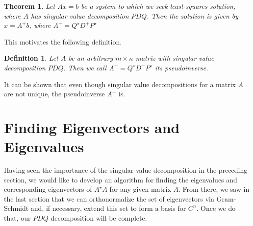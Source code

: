 \documentclass[12pt,reqno]{amsart}
\numberwithin{equation}{section}  %
\newtheorem{theorem}{Theorem}
\newtheorem*{definition}{Definition}
\begin{document}
\begin{theorem}
Let $Ax = b$ be a system to which we seek least-squares solution, where
$A$ has singular value decomposition $PDQ$.
Then the solution is given by $x = A^{+}b$, where $A^{+} = Q^{\star} D^{+} P^{\star}$
\end{theorem}
This motivates the following definition.
\begin{definition}
Let $A$ be an arbitrary $m \times n$ matrix with singular value decomposition $PDQ$. 
Then we call $A^{+} = Q^{\star}D^{+} P^{\star}$ its \emph{pseudoinverse}.
\end{definition}
It can be shown that even though singular value decompositions for a matrix $A$ are not
unique, the pseudoinverse $A^{+}$ is. 
\section{Finding Eigenvectors and Eigenvalues}
Having seen the importance of the singular value decomposition in the preceding
section, we would like to develop an algorithm for finding the eigenvalues and
corresponding eigenvectors of $A^{\star}A$ for any given matrix $A$. From there,
we saw in the last section that we can orthonormalize the set of eigenvectors
via Gram-Schmidt and, if necessary, extend this set to form a basis for $C^{n}$.
Once we do that, our $PDQ$ decomposition will be complete.
\end{document}
